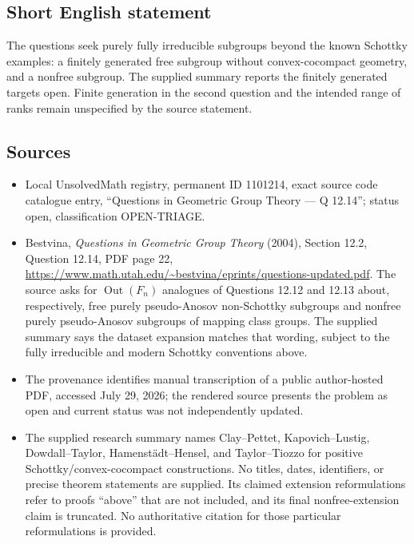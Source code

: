 \documentclass[11pt]{article}
\begin{document}
\subsection{Short English statement}
The questions seek purely fully irreducible subgroups beyond the known Schottky examples: a finitely generated free subgroup without convex-cocompact geometry, and a nonfree subgroup. The supplied summary reports the finitely generated targets open. Finite generation in the second question and the intended range of ranks remain unspecified by the source statement.
\subsection{Sources}
\begin{itemize}
\item Local UnsolvedMath registry, permanent ID 1101214, exact source code catalogue entry, ``Questions in Geometric Group Theory --- Q 12.14''; status open, classification OPEN-TRIAGE.
\item Bestvina, \emph{Questions in Geometric Group Theory} (2004), Section 12.2, Question 12.14, PDF page 22, \url{https://www.math.utah.edu/~bestvina/eprints/questions-updated.pdf}. The source asks for $\operatorname{Out}(F_n)$ analogues of Questions 12.12 and 12.13 about, respectively, free purely pseudo-Anosov non-Schottky subgroups and nonfree purely pseudo-Anosov subgroups of mapping class groups. The supplied summary says the dataset expansion matches that wording, subject to the fully irreducible and modern Schottky conventions above.
\item The provenance identifies manual transcription of a public author-hosted PDF, accessed July 29, 2026; the rendered source presents the problem as open and current status was not independently updated.
\item The supplied research summary names Clay--Pettet, Kapovich--Lustig, Dowdall--Taylor, Hamenst\"adt--Hensel, and Taylor--Tiozzo for positive Schottky/convex-cocompact constructions. No titles, dates, identifiers, or precise theorem statements are supplied. Its claimed extension reformulations refer to proofs ``above'' that are not included, and its final nonfree-extension claim is truncated. No authoritative citation for those particular reformulations is provided.
\end{itemize}
\end{document}
